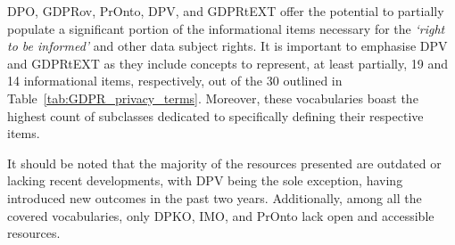 DPO, GDPRov, PrOnto, DPV, and GDPRtEXT offer the potential to partially populate a significant portion of the informational items necessary for the \textit{`right to be informed'} and other data subject rights.
It is important to emphasise DPV and GDPRtEXT as they include concepts to represent, at least partially, 19 and 14 informational items, respectively, out of the 30 outlined in Table~\ref{tab:GDPR_privacy_terms}.
Moreover, these vocabularies boast the highest count of subclasses dedicated to specifically defining their respective items.

It should be noted that the majority of the resources presented are outdated or lacking recent developments, with DPV being the sole exception, having introduced new outcomes in the past two years.
Additionally, among all the covered vocabularies, only DPKO, IMO, and PrOnto lack open and accessible resources.